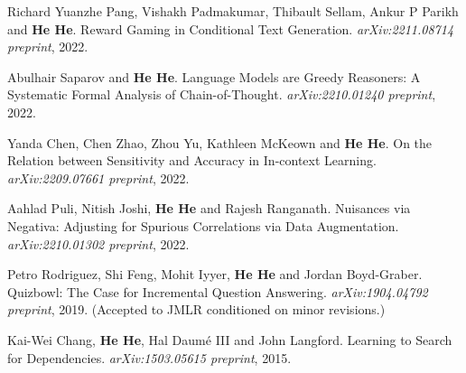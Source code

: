 Richard Yuanzhe Pang, Vishakh Padmakumar, Thibault Sellam, Ankur P Parikh and \textbf{He He}. Reward Gaming in Conditional Text Generation. \textit{arXiv:2211.08714 preprint}, 2022.

Abulhair Saparov and \textbf{He He}. Language Models are Greedy Reasoners: A Systematic Formal Analysis of Chain-of-Thought. \textit{arXiv:2210.01240 preprint}, 2022.

Yanda Chen, Chen Zhao, Zhou Yu, Kathleen McKeown and \textbf{He He}. On the Relation between Sensitivity and Accuracy in In-context Learning. \textit{arXiv:2209.07661 preprint}, 2022.

Aahlad Puli, Nitish Joshi, \textbf{He He} and Rajesh Ranganath. Nuisances via Negativa: Adjusting for Spurious Correlations via Data Augmentation. \textit{arXiv:2210.01302 preprint}, 2022.

Petro Rodriguez, Shi Feng, Mohit Iyyer, \textbf{He He} and Jordan Boyd-Graber. Quizbowl: The Case for Incremental Question Answering. \textit{arXiv:1904.04792 preprint}, 2019. (Accepted to JMLR conditioned on minor revisions.)

Kai-Wei Chang, \textbf{He He}, Hal Daum\'e III and John Langford. Learning to Search for Dependencies. \textit{arXiv:1503.05615 preprint}, 2015.

